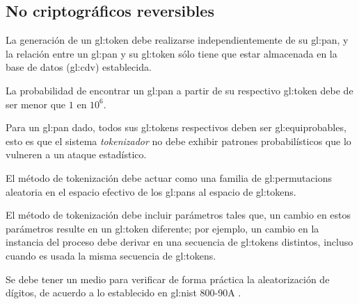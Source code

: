 %
%

\subsection{No criptográficos reversibles}

{
  La generación de un \gls{gl:token} debe realizarse independientemente de
  su \gls{gl:pan}, y la relación entre un \gls{gl:pan} y su \gls{gl:token}
  sólo tiene que estar almacenada en la base de datos (\gls{gl:cdv})
  establecida.
}

{
  La probabilidad de encontrar un \gls{gl:pan} a partir de su respectivo
  \gls{gl:token} debe de ser menor que $1$ en $10^6$.

  {
    Para un \gls{gl:pan} dado, todos sus \glspl{gl:token} respectivos
    deben ser \glspl{gl:equiprobable}, esto es que el sistema
    \textit{tokenizador} no debe exhibir patrones probabilísticos que
    lo vulneren a un ataque estadístico.
  }

  {
    El método de tokenización debe actuar como una familia de
    \glspl{gl:permutacion} aleatoria en el espacio efectivo de los
    \glspl{gl:pan} al espacio de \glspl{gl:token}.
  }

  {
    El método de tokenización debe incluir parámetros tales que, un
    cambio en estos parámetros resulte en un \gls{gl:token} diferente;
    por ejemplo, un cambio en la instancia del proceso debe derivar en
    una secuencia de \glspl{gl:token} distintos, incluso cuando es usada
    la misma secuencia de \glspl{gl:token}.
  }


  {
    Se debe tener un medio para verificar de forma práctica la aleatorización
    de dígitos, de acuerdo a lo establecido en \gls{gl:nist} 800-90A
    \cite{nist_aleatorios}.
  }
}

